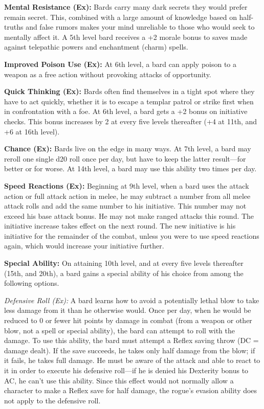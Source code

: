 \textbf{Mental Resistance (Ex):} Bards carry many dark secrets they would prefer remain secret. This, combined with a large amount of knowledge based on half-truths and false rumors makes your mind unreliable to those who would seek to mentally affect it. A 5th level bard receives a +2 morale bonus to saves made against telepathic powers and enchantment (charm) spells.

\textbf{Improved Poison Use (Ex):} At 6th level, a bard can apply poison to a weapon as a free action without provoking attacks of opportunity.

\textbf{Quick Thinking (Ex):} Bards often find themselves in a tight spot where they have to act quickly, whether it is to escape a templar patrol or strike first when in confrontation with a foe. At 6th level, a bard gets a +2 bonus on initiative checks. This bonus increases by 2 at every five levels thereafter (+4 at 11th, and +6 at 16th level).

\textbf{Chance (Ex):} Bards live on the edge in many ways. At 7th level, a bard may reroll one single d20 roll once per day, but have to keep the latter result---for better or for worse. At 14th level, a bard may use this ability two times per day.

\textbf{Speed Reactions (Ex):} Beginning at 9th level, when a bard uses the attack action or full attack action in melee, he may subtract a number from all melee attack rolls and add the same number to his initiative. This number may not exceed his base attack bonus. He may not make ranged attacks this round. The initiative increase takes effect on the next round. The new initiative is his initiative for the remainder of the combat, unless you were to use speed reactions again, which would increase your initiative further.

\textbf{Special Ability:} On attaining 10th level, and at every five levels thereafter (15th, and 20th), a bard gains a special ability of his choice from among the following options.

\textit{Defensive Roll (Ex):} A bard learns how to avoid a potentially lethal blow to take less damage from it than he otherwise would. Once per day, when he would be reduced to 0 or fewer hit points by damage in combat (from a weapon or other blow, not a spell or special ability), the bard can attempt to roll with the damage. To use this ability, the bard must attempt a Reflex saving throw (DC = damage dealt). If the save succeeds, he takes only half damage from the blow; if it fails, he takes full damage. He must be aware of the attack and able to react to it in order to execute his defensive roll---if he is denied his Dexterity bonus to AC, he can't use this ability. Since this effect would not normally allow a character to make a Reflex save for half damage, the rogue's evasion ability does not apply to the defensive roll.

